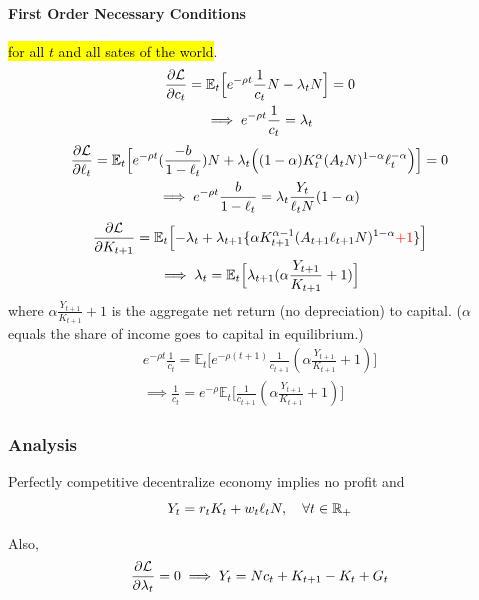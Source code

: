 \documentclass[11pt]{article}
\newcommand{\expat}[2]{\mathbb{E}_{#1}\Big[{#2}\Big]}
\begin{document}
			\paragraph{First Order Necessary Conditions}\hl{for all $t$ and all sates of the world}.
			\begin{gather*}
				\pd{\mc{L}}{c_t} = \expat{t}{e^{-\rho t} \frac{1}{c_t}N - \lambda_t N} = 0 \\
				\implies e^{-\rho t} \frac{1}{c_t} = \lambda_t
			\end{gather*}
			\begin{gather*}
				\pd{\mc{L}}{\ell_t} = \expat{t}{e^{-\rho t} (\frac{-b}{1-\ell_t})N + \lambda_t \Big( (1-\alpha)K_t^\alpha (A_t N)^{1-\alpha} \ell_t ^ {-\alpha}\Big)} = 0 \\
				\implies e^{-\rho t} \frac{b}{1-\ell_t} = \lambda_t \frac{Y_t}{\ell_t N} (1-\alpha)
			\end{gather*}
			\begin{gather*}
				\pd{\mc{L}}{K_{t+1}} = \expat{t}{-\lambda_t + \lambda_{t+1}\{\alpha K_{t+1}^{\alpha-1}(A_{t+1} \ell_{t+1} N)^{1-\alpha} \textcolor{red}{+ 1}\}} \\
				\implies \lambda_t = \expat{t}{\lambda_{t+1} (\alpha \frac{Y_{t+1}}{K_{t+1}} + 1)}
			\end{gather*}
			where $\alpha \frac{Y_{t+1}}{K_{t+1}} + 1$ is the aggregate net return (no depreciation) to capital. ($\alpha$ equals the share of income goes to capital in equilibrium.) \\
			\begin{gather*}
				e^{-\rho t} \frac{1}{c_t} = \expat{t}{e^{-\rho(t+1)} \frac{1}{c_{t+1}} (\alpha \frac{Y_{t+1}}{K_{t+1}} + 1)} \\
				\implies \frac{1}{c_t} = e^{-\rho}\expat{t}{\frac{1}{c_{t+1}} (\alpha \frac{Y_{t+1}}{K_{t+1}} + 1)}
			\end{gather*}
		\subsubsection{Analysis}
			\begin{remark}
				Perfectly competitive decentralize economy implies no profit and
				\[
					Y_t = r_t K_t + w_t \ell_t N,\quad \forall t \in \mathbb{R}_+
				\]
			\end{remark}
			Also,
			\begin{gather*}
				\frac{\partial{\mathcal{{L}}}}{\partial{\lambda_t}} = 0 
				\implies Y_t = Nc_t + K_{t+1} - K_t + G_t
			\end{gather*}
			
\end{document}
